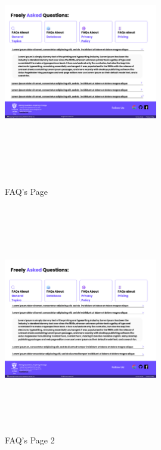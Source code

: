 \begin{figure}[H]
\includegraphics[height=10cm, width=0.6\textwidth]{./images/prototype/FAQs}
\centering 
\caption{FAQ's Page}
\label{fig:prototype1}


\includegraphics[height=10cm, width=0.6\textwidth]{./images/prototype/FAQs (1)}
\centering 
\caption{FAQ's Page 2}
\label{fig:prototype1}
\end{figure}

